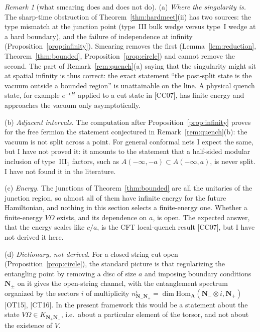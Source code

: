 \documentclass[11pt]{article}
\theoremstyle{definition}
\theoremstyle{remark}
\newtheorem{remark}[theorem]{Remark}
\newcommand{\bfA}{\mathbf A}
\begin{document}
\begin{remark}[what smearing does and does not do]\label{rem:smeared}
(a) \emph{Where the singularity is.} The sharp-time obstruction of Theorem~\ref{thm:hardmeet}(ii) has two sources: the type mismatch at the junction point (type~III bulk wedge versus type~I wedge at a hard boundary), and the failure of independence at infinity (Proposition~\ref{prop:infinity}). Smearing removes the first (Lemma~\ref{lem:reduction}, Theorem~\ref{thm:bounded}, Proposition~\ref{prop:circle}) and cannot remove the second. The part of Remark~\ref{rem:quench}(a) saying that the singularity might sit at spatial infinity is thus correct: the exact statement ``the post-split state is the vacuum outside a bounded region'' is unattainable on the line. A physical quench state, for example $e^{-\epsilon H}$ applied to a cut state in [CC07], has finite energy and approaches the vacuum only asymptotically.

(b) \emph{Adjacent intervals.} The computation after Proposition~\ref{prop:infinity} proves for the free fermion the statement conjectured in Remark~\ref{rem:quench}(b): the vacuum is not split across a point. For general conformal nets I expect the same, but I have not proved it: it amounts to the statement that a half-sided modular inclusion of type~III$_1$ factors, such as $A(-\infty,-a)\subset A(-\infty,a)$, is never split. I have not found it in the literature.

(c) \emph{Energy.} The junctions of Theorem~\ref{thm:bounded} are all the unitaries of the junction region, so almost all of them have infinite energy for the future Hamiltonian, and nothing in this section selects a finite-energy one. Whether a finite-energy $V\Omega$ exists, and its dependence on $a$, is open. The expected answer, that the energy scales like $c/a$, is the CFT local-quench result [CC07], but I have not derived it here.

(d) \emph{Dictionary, not derived.} For a closed string cut open (Proposition~\ref{prop:circle}), the standard picture is that regularizing the entangling point by removing a disc of size $a$ and imposing boundary conditions $\mathbf N_\pm$ on it gives the open-string channel, with the entanglement spectrum organized by the sectors $i$ of multiplicity $n^{i}_{\mathbf N_-\mathbf N_+}=\dim\mathrm{Hom}_{\bfA}(\mathbf N_-\otimes i,\mathbf N_+)$ [OT15], [CT16]. In the present framework this would be a statement about the state $V\Omega\in K_{\mathbf N_+\mathbf N_-}$, i.e.\ about a particular element of the torsor, and not about the existence of $V$.
\end{remark}
\end{document}
